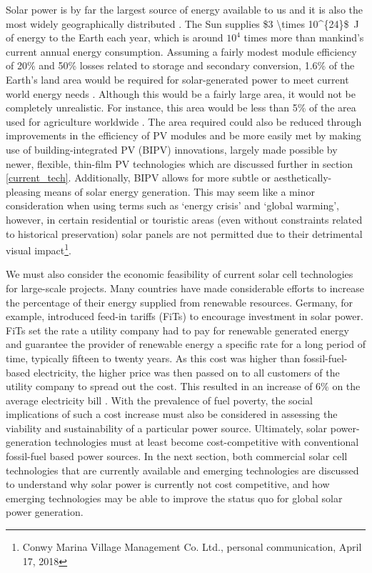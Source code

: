 \documentclass[11pt, twoside]{report}
\begin{document}
Solar power is by far the largest source of energy available to us and it is also the most widely geographically distributed \cite{inorg_pv}. The Sun supplies \SI{$3 \times 10^{24}$}{J} of energy to the Earth each year, which is around $10^4$ times more than mankind's current annual energy consumption. 
Assuming a fairly modest module efficiency of 20\% and 50\% losses related to storage and secondary conversion, 1.6\% of the Earth’s land area would be required for solar-generated power to meet current world energy needs \cite{newPVrev}. Although this would be a fairly large area, it would not be completely unrealistic. For instance, this area would be less than 5\% of the area used for agriculture worldwide \cite{newPVrev}. The area required could also be reduced through improvements in the efficiency of PV modules and be more easily met by making use of building-integrated PV (BIPV) innovations, largely made possible by newer, flexible, thin-film PV technologies which are discussed further in section \ref{current_tech}.
Additionally, BIPV allows for more subtle or aesthetically-pleasing means of solar energy generation. This may seem like a minor consideration when using terms such as `energy crisis' and `global warming', however, in certain residential or touristic areas (even without constraints related to historical preservation) solar panels are not permitted due to their detrimental visual impact\footnote{Conwy Marina Village Management Co. Ltd., personal communication, April 17, 2018}.

We must also consider the economic feasibility of current solar cell technologies for large-scale projects.
Many countries have made considerable efforts to increase the percentage of their energy supplied from renewable resources. Germany, for example, introduced feed-in tariffs (FiTs) to encourage investment in solar power.
FiTs set the rate a utility company had to pay for renewable generated energy and guarantee the provider of renewable energy a specific rate for a long period of time, typically fifteen to twenty years. As this cost was higher than fossil-fuel-based electricity, the higher price was then passed on to all customers of the utility company to spread out the cost. This resulted in an increase of 6\% on the average electricity bill \cite{Germany_Oregon}. With the prevalence of fuel poverty, the social implications of such a cost increase must also be considered in assessing the viability and sustainability of a particular power source.
Ultimately, solar power-generation technologies must at least become cost-competitive with conventional fossil-fuel based power sources.
In the next section, both commercial solar cell technologies that are currently available and emerging technologies are discussed to understand why solar power is currently not cost competitive, and how emerging technologies may be able to improve the status quo for global solar power generation.
\end{document}
